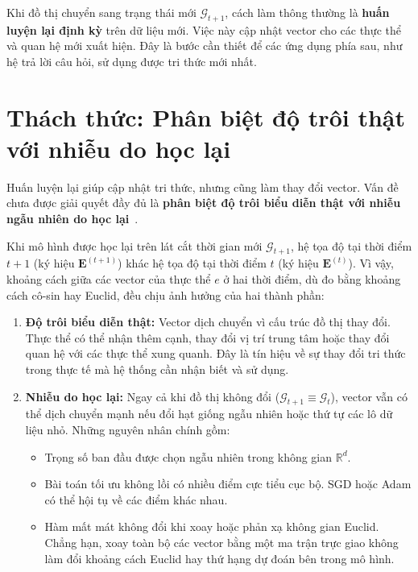 Khi đồ thị chuyển sang trạng thái mới $\mathcal{G}_{t+1}$, cách làm thông thường là \textbf{huấn luyện lại định kỳ} trên dữ liệu mới. Việc này cập nhật vector cho các thực thể và quan hệ mới xuất hiện. Đây là bước cần thiết để các ứng dụng phía sau, như hệ trả lời câu hỏi, sử dụng được tri thức mới nhất.

\section{Thách thức: Phân biệt độ trôi thật với nhiễu do học lại}
\label{sec:core_challenge}

Huấn luyện lại giúp cập nhật tri thức, nhưng cũng làm thay đổi vector. Vấn đề chưa được giải quyết đầy đủ là \textbf{phân biệt độ trôi biểu diễn thật với nhiễu ngẫu nhiên do học lại}~\cite{hamilton2016diachronic,kutuzov2018diachronic}.

Khi mô hình được học lại trên lát cắt thời gian mới $\mathcal{G}_{t+1}$, hệ tọa độ tại thời điểm $t+1$ (ký hiệu $\mathbf{E}^{(t+1)}$) khác hệ tọa độ tại thời điểm $t$ (ký hiệu $\mathbf{E}^{(t)}$). Vì vậy, khoảng cách giữa các vector của thực thể $e$ ở hai thời điểm, dù đo bằng khoảng cách cô-sin hay Euclid, đều chịu ảnh hưởng của hai thành phần:


\begin{enumerate}
    \item \textbf{Độ trôi biểu diễn thật:} Vector dịch chuyển vì cấu trúc đồ thị thay đổi. Thực thể có thể nhận thêm cạnh, thay đổi vị trí trung tâm hoặc thay đổi quan hệ với các thực thể xung quanh. Đây là tín hiệu về sự thay đổi tri thức trong thực tế mà hệ thống cần nhận biết và sử dụng.
    \item \textbf{Nhiễu do học lại:} Ngay cả khi đồ thị không đổi ($\mathcal{G}_{t+1} \equiv \mathcal{G}_t$), vector vẫn có thể dịch chuyển mạnh nếu đổi hạt giống ngẫu nhiên hoặc thứ tự các lô dữ liệu nhỏ. Những nguyên nhân chính gồm:
    \begin{itemize}
        \item Trọng số ban đầu được chọn ngẫu nhiên trong không gian $\mathbb{R}^d$.
        \item Bài toán tối ưu không lồi có nhiều điểm cực tiểu cục bộ. SGD hoặc Adam có thể hội tụ về các điểm khác nhau.
        \item Hàm mất mát không đổi khi xoay hoặc phản xạ không gian Euclid. Chẳng hạn, xoay toàn bộ các vector bằng một ma trận trực giao không làm đổi khoảng cách Euclid hay thứ hạng dự đoán bên trong mô hình.
    \end{itemize}
\end{enumerate}

